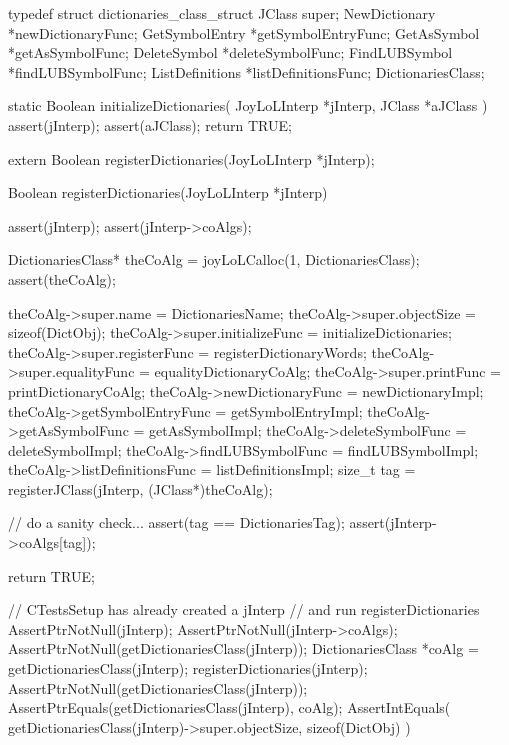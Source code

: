 \startTestSuite[registerDictionaries]

\startCHeader
typedef struct dictionaries_class_struct {
  JClass           super;
  NewDictionary   *newDictionaryFunc;
  GetSymbolEntry  *getSymbolEntryFunc;
  GetAsSymbol     *getAsSymbolFunc;
  DeleteSymbol    *deleteSymbolFunc;
  FindLUBSymbol   *findLUBSymbolFunc;
  ListDefinitions *listDefinitionsFunc;  
} DictionariesClass;

\stopCHeader

\startCCode
static Boolean initializeDictionaries(
  JoyLoLInterp *jInterp,
  JClass       *aJClass
) {
  assert(jInterp);
  assert(aJClass);
  return TRUE;
}
\stopCCode

\startCHeader
extern Boolean registerDictionaries(JoyLoLInterp *jInterp);
\stopCHeader
{}

\startCCode
Boolean registerDictionaries(JoyLoLInterp *jInterp) {
  assert(jInterp);
  assert(jInterp->coAlgs);
  
  DictionariesClass* theCoAlg
    = joyLoLCalloc(1, DictionariesClass);
  assert(theCoAlg);
  
  theCoAlg->super.name           = DictionariesName;
  theCoAlg->super.objectSize     = sizeof(DictObj);
  theCoAlg->super.initializeFunc = initializeDictionaries;
  theCoAlg->super.registerFunc   = registerDictionaryWords;
  theCoAlg->super.equalityFunc   = equalityDictionaryCoAlg;
  theCoAlg->super.printFunc      = printDictionaryCoAlg;
  theCoAlg->newDictionaryFunc    = newDictionaryImpl;
  theCoAlg->getSymbolEntryFunc   = getSymbolEntryImpl;
  theCoAlg->getAsSymbolFunc      = getAsSymbolImpl;
  theCoAlg->deleteSymbolFunc     = deleteSymbolImpl;
  theCoAlg->findLUBSymbolFunc    = findLUBSymbolImpl;
  theCoAlg->listDefinitionsFunc  = listDefinitionsImpl;  
  size_t tag =
    registerJClass(jInterp, (JClass*)theCoAlg);
  
  // do a sanity check...
  assert(tag == DictionariesTag);
  assert(jInterp->coAlgs[tag]);
   
  return TRUE;
}
\stopCCode


\startCTest
  // CTestsSetup has already created a jInterp
  // and run registerDictionaries
  AssertPtrNotNull(jInterp);
  AssertPtrNotNull(jInterp->coAlgs);
  AssertPtrNotNull(getDictionariesClass(jInterp));
  DictionariesClass *coAlg = getDictionariesClass(jInterp);
  registerDictionaries(jInterp);
  AssertPtrNotNull(getDictionariesClass(jInterp));
  AssertPtrEquals(getDictionariesClass(jInterp), coAlg);
  AssertIntEquals(
    getDictionariesClass(jInterp)->super.objectSize,
    sizeof(DictObj)
  )
\stopCTest
\stopTestCase
\stopTestSuite
